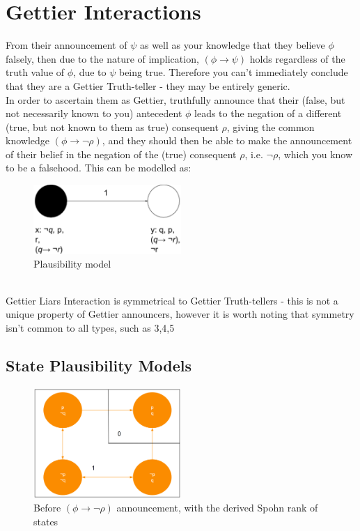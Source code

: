 \documentclass[12pt, titlepage, twoside, a4paper]{report}
\begin{document}
\section{Gettier Interactions}
From their announcement of $\psi$ as well as your knowledge that they believe $\phi$ falsely, then due to the nature of implication, $(\phi \to \psi)$ holds regardless of the truth value of $\phi$, due to $\psi$ being true. Therefore you can't immediately conclude that they are a Gettier Truth-teller - they may be entirely generic.\\
In order to ascertain them as Gettier, truthfully announce that their (false, but not necessarily known to you) antecedent $\phi$ leads to the negation of a different (true, but not known to them as true) consequent $\rho$,  giving the common knowledge $(\phi \to \neg \rho)$, and they should then be able to make the announcement of their belief in the negation of the (true) consequent $\rho$, i.e. $\neg \rho$, which you know to be a falsehood. This can be modelled as:\\
\begin{figure}[h]
  \centering
  \includegraphics[width=0.5\textwidth]{gettiermodelbase.eps}
  \caption{Plausibility model}
\end{figure}\\
Gettier Liars Interaction is symmetrical to Gettier Truth-tellers - this is not a unique property  of Gettier announcers, however it is worth noting that symmetry isn't common to all types, such as 3,4,5
\newpage
\subsection{State Plausibility Models}

\begin{figure}[h]
  \centering
  \includegraphics[width=0.5\textwidth]{slide19.eps}
  \caption{Before $(\phi \to \neg \rho)$ announcement, with the derived Spohn rank of states}
\end{figure}
\end{document}
